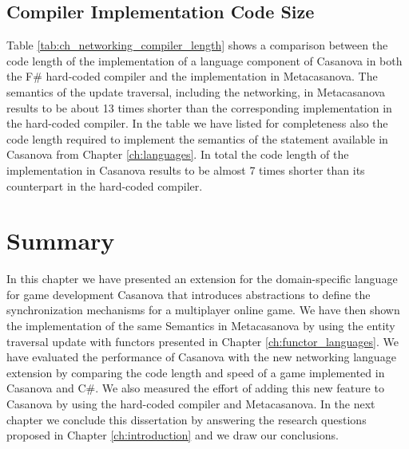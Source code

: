 \subsection{Compiler Implementation Code Size}
Table \ref{tab:ch_networking_compiler_length} shows a comparison between the code length of the implementation of a language component of Casanova in both the F\# hard-coded compiler and the implementation in Metacasanova. The semantics of the update traversal, including the networking, in Metacasanova results to be about 13 times shorter than the corresponding implementation in the hard-coded compiler. In the table we have listed for completeness also the code length required to implement the semantics of the statement available in Casanova from Chapter \ref{ch:languages}. In total the code length of the implementation in Casanova results to be almost 7 times shorter than its counterpart in the hard-coded compiler.

\section{Summary}
In this chapter we have presented an extension for the domain-specific language for game development Casanova that introduces abstractions to define the synchronization mechanisms for a multiplayer online game. We have then shown the implementation of the same Semantics in Metacasanova by using the entity traversal update with functors presented in Chapter \ref{ch:functor_languages}. We have evaluated the performance of Casanova with the new networking language extension by comparing the code length and speed of a game implemented in Casanova and C\#. We also measured the effort of adding this new feature to Casanova by using the hard-coded compiler and Metacasanova. In the next chapter we conclude this dissertation by answering the research questions proposed in Chapter \ref{ch:introduction} and we draw our conclusions.
